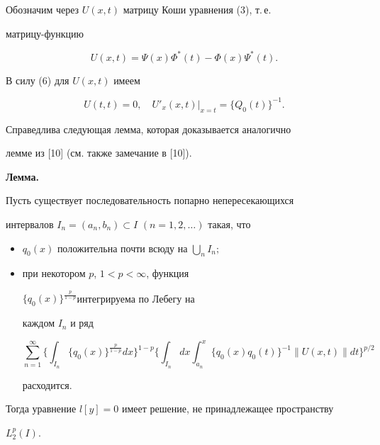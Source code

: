  


Обозначим через $U(x,t)$ матрицу Коши уравнения (3), т.\,е. 


матрицу-функцию 


$$ 


U(x,t)=\Psi(x)\Phi^*(t)-\Phi(x)\Psi^*(t). 


$$ 


В силу (6) для $U(x,t)$ имеем 


\begin{equation} 


U(t,t)=0,\quad U'_x(x,t)|_{x=t}=\{Q_0(t)\}^{-1}. 


\end{equation} 


 


Справедлива следующая лемма, которая доказывается аналогично 


лемме из [10] (см. также замечание в [10]). 


\medskip 


 


{\bf Лемма.} {\it 


Пусть существует последовательность попарно непересекающихся 


интервалов $I_n=(a_n,b_n)\subset I$ $(n=1,2,\dotsc)$ такая, что 


\begin{itemize} 


\item[1)] $q_0(x)$ положительна почти всюду на $\bigcup\limits_n I_n;$ 


\item[2)] при некотором $p$, $1<p<\infty$, функция 


$\{q_0(x)\}^{\frac{p}{1-p}}$интегрируема по Лебегу на 


каждом $I_n$ и ряд 


$$ 


\sum^\infty_{n=1}\bigg\{\int_{I_n}\{q_0(x)\}^{\frac{p}{1-p}} 


d x\bigg\}^{1-p}\bigg\{\int_{I_n}d x\int^x_{a_n} 


\{q_0(x)q_0(t)\}^{-1}\|U(x,t)\|d t\bigg\}^{p/2} 


$$ 


расходится. 


\end{itemize} 


Тогда уравнение $l[y]=0$ имеет решение, не принадлежащее пространству 


$L^p_2(I)$. 


} 


